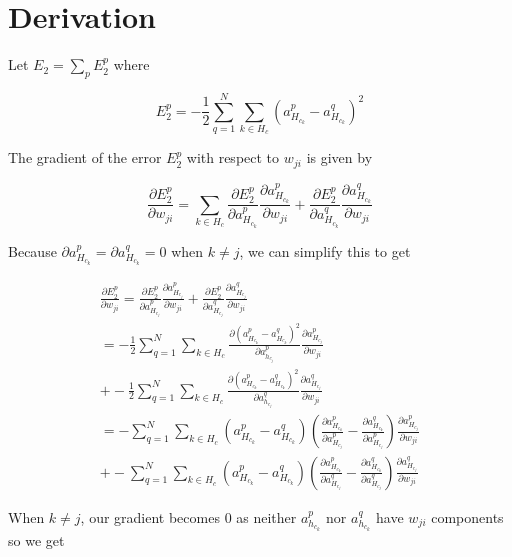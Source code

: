 \section{Derivation}
\label{sec:derivation}

Let $E_2 = \sum_{p} E_2^p$ where

\begin{equation}
  E_2^p = -\frac{1}{2}\sum_{q=1}^N \sum_{k \in H_c} (a_{H_{c_k}}^p - a_{H_{c_k}}^q)^2
\end{equation}

The gradient of the error $E_2^p$ with respect to $w_{ji}$ is given by

\begin{equation}
  \frac{\partial E_2^p}{\partial w_{ji}} = \sum_{k \in H_c} \frac{\partial E_2^p}{\partial a_{H_{c_k}}^p} \frac{\partial a_{H_{c_k}}^p}{\partial w_{ji}} + \frac{\partial E_2^p}{\partial a_{H_{c_k}}^q} \frac{\partial a_{H_{c_k}}^q}{\partial w_{ji}}
\end{equation}

Because $\partial a_{H_{c_k}}^p = \partial a_{H_{c_k}}^q = 0$ when $k \neq j$,
we can simplify this to get

\begin{align}
  \frac{\partial E_2^p}{\partial w_{ji}} = \frac{\partial E_2^p}{\partial a_{H_{c_j}}^p} \frac{\partial a_{H_{c_j}}^p}{\partial w_{ji}} + \frac{\partial E_2^p}{\partial a_{H_{c_j}}^q} \frac{\partial a_{H_{c_j}}^q}{\partial w_{ji}} \nonumber \\
  = -\frac{1}{2} \sum_{q=1}^N \sum_{k \in H_c} \frac{\partial(a_{H_{c_k}}^p - a_{H_{c_k}}^q)^2}{\partial a_{h_{c_j}}^p} \frac{\partial a_{H_{c_j}}^p}{\partial w_{ji}} \nonumber \\
  + -\frac{1}{2} \sum_{q=1}^N \sum_{k \in H_c} \frac{\partial(a_{H_{c_k}}^p - a_{H_{c_k}}^q)^2}{\partial a_{h_{c_j}}^q} \frac{\partial a_{H_{c_j}}^q}{\partial w_{ji}} \nonumber \\
  = - \sum_{q=1}^N \sum_{k \in H_c} (a_{H_{c_k}}^p-a_{H_{c_k}}^q)(\frac{\partial a_{H_{c_k}}^p}{\partial a_{H_{c_j}}^p}-\frac{\partial a_{H_{c_k}}^q}{\partial a_{H_{c_j}}^p})\frac{\partial a_{H_{c_j}}^p}{\partial w_{ji}} \nonumber \\
  + - \sum_{q=1}^N \sum_{k \in H_c} (a_{H_{c_k}}^p-a_{H_{c_k}}^q)(\frac{\partial a_{H_{c_k}}^p}{\partial a_{H_{c_j}}^q}-\frac{\partial a_{H_{c_k}}^q}{\partial a_{H_{c_j}}^q})\frac{\partial a_{H_{c_j}}^q}{\partial w_{ji}} 
\end{align}

When $k \neq j$, our gradient becomes $0$ as neither $a_{h_{c_k}}^p$ nor $a_{h_{c_k}}^q$
have $w_{ji}$ components so we get

